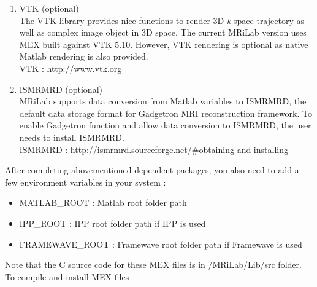 \documentclass{book}%
\begin{document}
\begin{enumerate}
\item VTK (optional) \\
The VTK library provides nice functions to render 3D \textit{k}-space trajectory as well as complex image object in 3D space. The current MRiLab version uses MEX built against VTK 5.10. However, VTK rendering is optional as native Matlab rendering is also provided. \\

VTK : \url{http://www.vtk.org} \\

\item ISMRMRD (optional) \\
MRiLab supports data conversion from Matlab variables to ISMRMRD, the default data storage format for Gadgetron MRI reconstruction framework. To enable Gadgetron function and allow data conversion to ISMRMRD, the user needs to install ISMRMRD. \\

ISMRMRD : \url{http://ismrmrd.sourceforge.net/#obtaining-and-installing}

\end{enumerate}

After completing abovementioned dependent packages, you also need to add a few environment variables in your system : 

\begin{itemize}
\item MATLAB\_ROOT : Matlab root folder path
\item IPP\_ROOT : IPP root folder path if IPP is used
\item FRAMEWAVE\_ROOT : Framewave root folder path if Framewave is used
\end{itemize}

Note that the C source code for these MEX files is in /MRiLab/Lib/src folder. To compile and install MEX files
\end{document}
